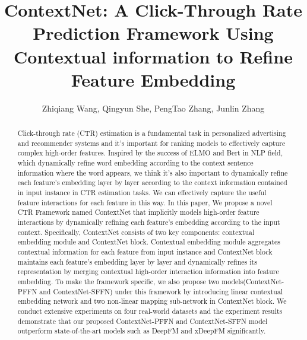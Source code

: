 \documentclass[sigconf]{acmart}
\begin{document}
\title{ContextNet: A Click-Through Rate Prediction Framework Using Contextual information to Refine Feature Embedding}



\author{Zhiqiang Wang, Qingyun She, PengTao Zhang, Junlin Zhang}




















\begin{abstract}
  Click-through rate (CTR)  estimation is a fundamental task in personalized advertising and recommender systems and it's important for ranking models to effectively capture complex high-order features. Inspired by the success of ELMO and Bert in NLP field, which dynamically refine word embedding according to the context sentence information where the word appears, we think it's also important to dynamically refine each feature's embedding layer by layer according to the context information contained in input instance in CTR estimation tasks. We can effectively capture the useful feature interactions for each feature in this way. In this paper, We propose a novel CTR Framework named ContextNet that implicitly models high-order feature interactions by dynamically refining each feature's embedding according to the input context. Specifically, ContextNet consists of two key components: contextual embedding module and ContextNet block. Contextual embedding module aggregates contextual information for each feature from input instance and ContextNet block maintains each feature's embedding layer by layer and dynamically refines its representation by merging contextual high-order interaction information into feature embedding. To make the framework specific, we also propose two models(ContextNet-PFFN and ContextNet-SFFN) under this framework by introducing linear contextual embedding network and two non-linear mapping sub-network in ContextNet block. We conduct extensive experiments on four real-world datasets and the experiment results demonstrate that our proposed ContextNet-PFFN and ContextNet-SFFN model outperform state-of-the-art models such as DeepFM and xDeepFM significantly.
\end{abstract}
\end{document}
